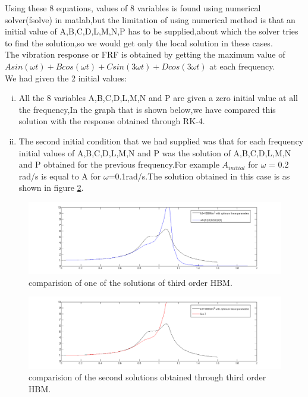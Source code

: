 Using these 8 equations, values of 8 variables is found using numerical solver(fsolve) in matlab,but the limitation of using numerical method is that an initial value of A,B,C,D,L,M,N,P has to be supplied,about which the solver tries to find the solution,so we would get only the local solution in these cases.\\
The vibration response or FRF is obtained by getting the maximum value of $Asin(\omega t)+Bcos(\omega t)+Csin(3\omega t)+Dcos(3\omega t) $ at each frequency.\\
We had given the 2 initial values:
\begin{enumerate}[i)]
\item All the 8 variables A,B,C,D,L,M,N and P are given a zero initial value at all the frequency,In the graph that is shown below,we have compared this solution with the response obtained through RK-4.

\item The second initial condition that we had supplied was that for each frequency initial values of A,B,C,D,L,M,N and P was the solution of A,B,C,D,L,M,N and P obtained for the previous frequency.For example $A_{initial}$ for $\omega$ = 0.2 rad/s is equal to A for $\omega$=0.1rad/s.The solution obtained in this case is as shown in figure \ref{fig:hbm}.
\end{enumerate}
\begin{figure}[h!]
\includegraphics[width=\textwidth,height=0.5\textwidth]{"figures/nonlinearity_primaryymass_3rdorder_2"}
\caption{ comparision of one of the solutions of third order HBM.}
  \label{fig:hbm}
\end{figure}
\begin{figure}[h!]
\includegraphics[width=\textwidth,height=0.5\textwidth]{"figures/nonlinearity_primaryymass_3rdorder"}
\caption{ comparision  of the second solutions obtained through third order HBM.}
  \label{fig:hbm}
\end{figure}

